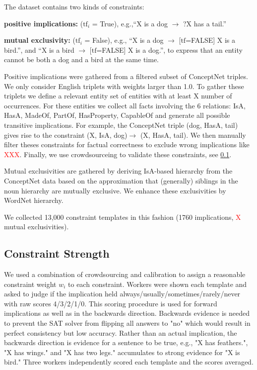 \documentclass[11pt]{article}
\newcommand{\eat}[1]{}
\newcommand{\red}[1]{\textcolor{red}{#1}}
\newenvironment{des}{                 %
     \parskip 0cm \begin{list}{}{\parsep 0cm \itemsep 0cm \topsep 0cm}}{
       \end{list}} %
\begin{document}
\noindent
The dataset contains two kinds of constraints:
\begin{des}
\item[{\bf positive implications:}] ($\textrm{tf}_i$ = True), e.g.,``X is a dog $\rightarrow$ ?X has a tail.''
\item[{\bf mutual exclusivity:}] ($\textrm{tf}_i$ = False), e.g.,
``X is a dog $\rightarrow$ [$\textrm{tf}$=FALSE] X is a bird.'',
and ``X is a bird $\rightarrow$ [$\textrm{tf}$=FALSE] X is a dog.'', to
express that an entity cannot be both a dog and a bird at the same time.

\end{des}
Positive implications were gathered from a filtered subset of ConceptNet triples.  We only consider English triplets with weights larger than 1.0. To gather these triplets we define a relevant entity set of entities with at least X number of occurrences. For these entities we collect all facts involving the 6 relations: IsA, HasA, MadeOf, PartOf, HasProperty, CapableOf and generate all possible transitive implications. For example, the ConceptNet triple (dog, HasA, tail) gives rise to the constraint (X, IsA, dog)$\rightarrow$ (X, HasA, tail).
We then manually filter theses constraints for factual correctness to exclude wrong implications like \red{XXX}. Finally, we use crowdsourceing to validate these constraints, see \ref{section:penalties}.

\eat{Mutual exclusivities were gathered from a filtered subset of the WordNet taxonomy,
based on the approximation that (generally) siblings in the WordNet noun hierarchy
are mutually exclusive \red{elaborate}.
}

Mutual exclusivities are gathered by deriving IsA-based hierarchy from the ConceptNet data based on the approximation that (generally) siblings in the noun hierarchy
are mutually exclusive. We enhance these exclusivities by WordNet hierarchy.


We collected 13,000 constraint templates in this fashion (1760 implications, \red{X} mutual
exclusivities).

\subsection{Constraint Strength}
\label{section:penalties}
We used a combination of crowdsourcing and calibration to assign a reasonable
constraint weight $w_i$ to each constraint. Workers were shown each
template and asked to judge if the implication held always/usually/sometimes/rarely/never with raw scores 4/3/2/1/0. This scoring procedure is used for forward implications as well as in the backwards direction. Backwards evidence is needed to prevent the SAT solver from flipping all answers to "no" which would result in perfect consistency but low accuracy. Rather than an actual implication, the backwards direction is evidence for a sentence to be true, e.g., "X has feathers.", "X has wings." and "X has two legs." accumulates to strong evidence for "X is bird." Three workers independently scored each template and the scores averaged.
\end{document}
